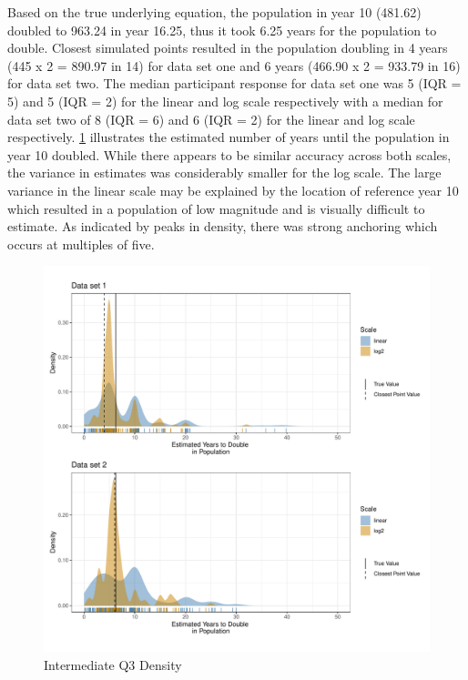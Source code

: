 \documentclass[print]{nuthesis}
\begin{document}
Based on the true underlying equation, the population in year 10 (481.62) doubled to 963.24 in year 16.25, thus it took 6.25 years for the population to double.
Closest simulated points resulted in the population doubling in 4 years (445 x 2 = 890.97 in 14) for data set one and 6 years (466.90 x 2 = 933.79 in 16) for data set two.
The median participant response for data set one was 5 (IQR = 5) and 5 (IQR = 2) for the linear and log scale respectively with a median for data set two of 8 (IQR = 6) and 6 (IQR = 2) for the linear and log scale respectively.
\cref{fig:qi3-density} illustrates the estimated number of years until the population in year 10 doubled.
While there appears to be similar accuracy across both scales, the variance in estimates was considerably smaller for the log scale.
The large variance in the linear scale may be explained by the location of reference year 10 which resulted in a population of low magnitude and is visually difficult to estimate.
As indicated by peaks in density, there was strong anchoring which occurs at multiples of five.

\begin{figure}[tbp]

{\centering \includegraphics[width=1\linewidth,]{thesis_files/figure-latex/qi3-density-1} 

}

\caption{Intermediate Q3 Density}\label{fig:qi3-density}
\end{figure}
\end{document}
